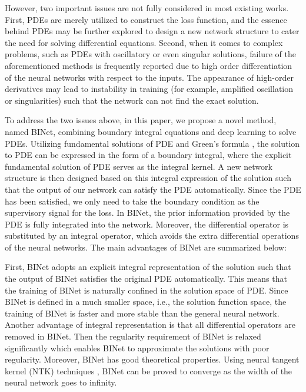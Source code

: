 \documentclass[hyperref]{article}
\numberwithin{equation}{section}
\theoremstyle{nonumberplain}
\begin{document}
	However, two important issues are not fully considered in most existing works. First, PDEs are merely utilized to construct the loss function, and the essence behind PDEs may be further explored to design a new network structure to cater the need for solving differential equations. Second, when it comes to complex problems, such as PDEs with oscillatory or even singular solutions, failure of the aforementioned methods is frequently reported \cite{wang2020and} due to high order differentiation of the neural networks with respect to the inputs. The appearance of high-order derivatives may lead to instability in training \cite{zhu2021local} (for example, amplified oscillation or singularities) such that the network can not find the exact solution. %
	
	
	
	
	To address the two issues above, in this paper, we propose a novel method, named BINet, combining boundary integral equations and deep learning to solve PDEs. Utilizing
	fundamental solutions of PDE and Green's formula \cite{kellogg1953foundations}, the solution to PDE can be expressed in the form of a boundary integral, where the explicit fundamental solution of PDE serves as the integral kernel. A new network structure is then designed based on this integral expression of the solution such that the output of our network can satisfy the PDE automatically. Since the PDE has been satisfied, we only need to take the boundary condition as the supervisory signal for the loss. In BINet, the prior information provided by the PDE is fully integrated into the network. Moreover, the differential operator is substituted by an integral operator, which avoids the extra differential operations of the neural networks. The main advantages of BINet are summarized below:
	
	
	
	
	
	
	First, BINet adopts an explicit integral representation of the solution such that the output of BINet satisfies the original PDE automatically. This means that the training of BINet is naturally confined in the solution space of PDE. Since BINet is defined in a much smaller space, i.e., the solution function space, the training of BINet is faster and more stable than the general neural network. Another advantage of integral representation is that all differential operators are removed in BINet. Then the regularity requirement of BINet is relaxed significantly which enables BINet to approximate the solutions with poor regularity. Moreover, BINet has good theoretical properties. Using neural tangent kernel (NTK) techniques \cite{jacot2018neural}, BINet can be proved to converge as the width of the neural network goes to infinity.
	
\end{document}
